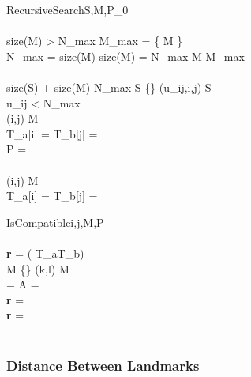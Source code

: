 \begin{pseudocode}{RecursiveSearch}{S,M,P_0}
 \\
 \\
 \IF size(M) > N_{max}\THEN
 \BEGIN
     M_{max} = \left\{ M \right\}\\
     N_{max} = size(M)
 \END
 \ELSEIF size(M) = N_{max}
 \BEGIN
     M \rightarrow M_{max}
 \END\\
 \\
 \WHILE size(S) + size(M) \ge N_{max} \AND S \ne \left\{\right\} \DO
 \BEGIN
      \left(u_{ij},i,j\right) \leftarrow S \\
      \IF u_{ij} < N_{max} \THEN
      \BEGIN
         \RETURN{}
      \END
\\
      \IF {} \THEN
      \BEGIN
         (i,j) \rightarrow M \\
         T_a[i] = T_b[j] = \TRUE\\
         P = \\
         \\
         (i,j) \leftarrow M\\
         T_a[i] = T_b[j] = \FALSE\\
      \END
 \END
\end{pseudocode}

\begin{pseudocode}{IsCompatible}{i,j,M,P}
  \\
  \\
  {\bf r} = \NOT \left( T_a\left[i\right] \OR T_b\left[j\right] \right)\\

   \AND M \ne \left\{\right\} \DO
  \BEGIN
     (k,l) \leftarrow M\\
     \left[E^a_{i,k}, E^b_{j,l}\right] = \TRUE \THEN
     \BEGIN
        A = \\
        {\bf r} = 
     \END\\
     \ELSE \BEGIN
        {\bf r} = \FALSE
     \END\\
  \END\\

\end{pseudocode}


\subsubsection{Distance Between Landmarks}

